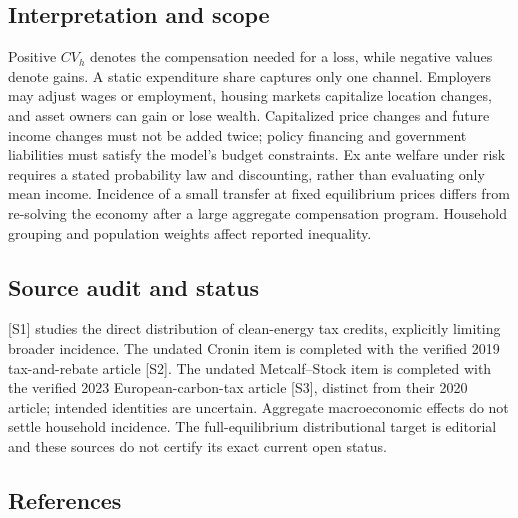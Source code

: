 \documentclass[11pt,a4paper]{article}
\begin{document}
\subsection*{Interpretation and scope}

Positive $CV_h$ denotes the compensation needed for a loss, while negative values denote gains. A static expenditure share captures only one channel. Employers may adjust wages or employment, housing markets capitalize location changes, and asset owners can gain or lose wealth. Capitalized price changes and future income changes must not be added twice; policy financing and government liabilities must satisfy the model's budget constraints. Ex ante welfare under risk requires a stated probability law and discounting, rather than evaluating only mean income. Incidence of a small transfer at fixed equilibrium prices differs from re-solving the economy after a large aggregate compensation program. Household grouping and population weights affect reported inequality.

\subsection*{Source audit and status}

[S1] studies the direct distribution of clean-energy tax credits, explicitly limiting broader incidence. The undated Cronin item is completed with the verified 2019 tax-and-rebate article [S2]. The undated Metcalf--Stock item is completed with the verified 2023 European-carbon-tax article [S3], distinct from their 2020 article; intended identities are uncertain. Aggregate macroeconomic effects do not settle household incidence. The full-equilibrium distributional target is editorial and these sources do not certify its exact current open status.

\subsection*{References}
\end{document}
